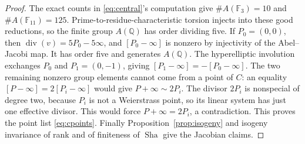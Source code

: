 \documentclass[11pt]{article}
\newcommand{\Q}{\mathbb Q}
\newcommand{\F}{\mathbb F}
\newcommand{\Sha}{\operatorname{Sha}}
\theoremstyle{definition}
\begin{document}
\begin{proof}
The exact counts in \eqref{eq:central}'s computation give
$\#A(\F_3)=10$ and $\#A(\F_{11})=125$. Prime-to-residue-characteristic
torsion injects into these good reductions, so the finite group
$A(\Q)$ has order dividing five. If $P_0=(0,0)$, then
$\operatorname{div}(v)=5P_0-5\infty$, and
$[P_0-\infty]$ is nonzero by injectivity of the Abel--Jacobi map.
It has order five and generates $A(\Q)$.
The hyperelliptic involution exchanges $P_0$ and $P_1=(0,-1)$, giving
$[P_1-\infty]=-[P_0-\infty]$. The two remaining nonzero group elements
cannot come from a point of $C$: an equality
$[P-\infty]=2[P_i-\infty]$ would give $P+\infty\sim2P_i$.
The divisor $2P_i$ is nonspecial of degree two, because $P_i$ is not
a Weierstrass point, so its linear system has just one effective
divisor. This would force $P+\infty=2P_i$, a contradiction.
This proves the point list \eqref{eq:cpoints}.
Finally Proposition~\ref{prop:isogeny} and isogeny invariance of rank
and of finiteness of $\Sha$ give the Jacobian claims.
\end{proof}










\end{document}

